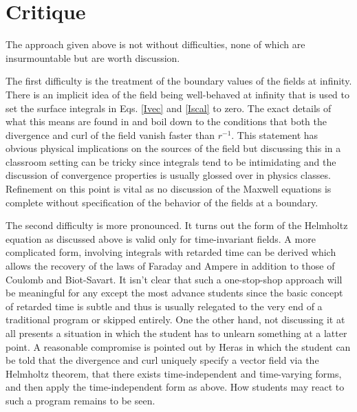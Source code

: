 \documentclass{article}
\begin{document}
\section{Critique}

The approach given above is not without difficulties, none of which are insurmountable but are worth discussion.

The first difficulty is the treatment of the boundary values of the fields at infinity.  There is an implicit idea of 
the field being well-behaved at infinity that is used to set the surface integrals in Eqs. \ref{Ivec} and \ref{Iscal} 
to zero. The exact details of what this means are found in \cite{Miller} and boil down to the conditions that both the 
divergence and curl of the field vanish faster than $r^{-1}$.  This statement has obvious physical implications on the 
sources of the field but discussing this in a classroom setting can be tricky since integrals tend to be intimidating 
and the discussion of convergence properties is usually glossed over in physics classes. Refinement on this point is 
vital as no discussion of the Maxwell equations is complete without specification of the behavior of the fields at a boundary.

The second difficulty is more pronounced.  It turns out the form of the Helmholtz equation as discussed above is 
valid only for time-invariant fields.  A more complicated form, involving integrals with retarded time can be 
derived \cite{Davis, Heras} which allows the recovery of the laws of Faraday and Ampere in addition to those of Coulomb 
and Biot-Savart. It isn't clear that such a one-stop-shop approach will be meaningful for any except the most advance 
students since the basic concept of retarded time is subtle and thus is usually relegated to the very end of a traditional 
program or skipped entirely. One the other hand, not discussing it at all presents a situation in which the student has 
to unlearn something at a latter point.  A reasonable compromise is pointed out by Heras \cite{Heras} in which the student 
can be told that the divergence and curl uniquely specify a vector field via the Helmholtz theorem, that there exists 
time-independent and time-varying forms, and then apply the time-independent form as above.   How students may react to 
such a program remains to be seen.
\end{document}
